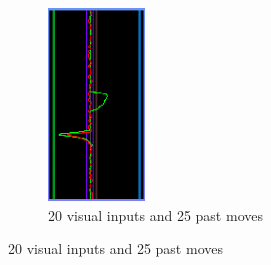 \begin{figure}[h]
    \centering
    \begin{subfigure}[h]{0.3\textwidth}
        \includegraphics[width=\textwidth]{img/recurrentBrute.png}
        \caption{20 visual inputs and 25 past moves}

\end{subfigure}
\end{figure}
